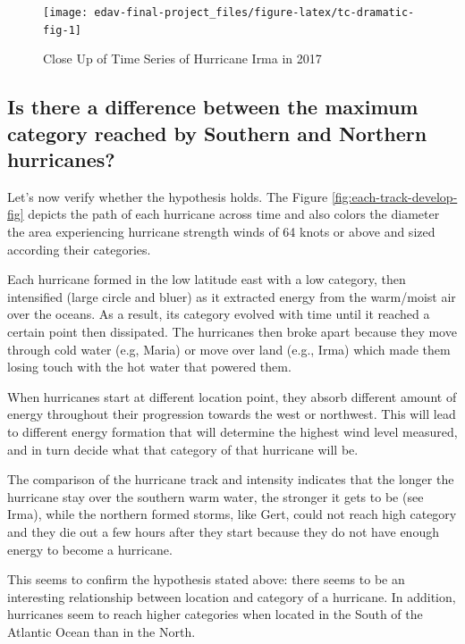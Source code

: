 \documentclass[]{book}
\begin{document}
\begin{figure}

{\centering \texttt{[image: edav-final-project\_files/figure-latex/tc-dramatic-fig-1]} 

}

\caption{Close Up of Time Series of Hurricane Irma in 2017}\label{fig:tc-dramatic-fig}
\end{figure}

\hypertarget{is-there-a-difference-between-the-maximum-category-reached-by-southern-and-northern-hurricanes}{%
\subsection{Is there a difference between the maximum category reached by Southern and Northern hurricanes?}\label{is-there-a-difference-between-the-maximum-category-reached-by-southern-and-northern-hurricanes}}

Let's now verify whether the hypothesis holds. The Figure \ref{fig:each-track-develop-fig} depicts the path of each hurricane across time and also colors the diameter the area experiencing hurricane strength winds of 64 knots or above and sized according their categories.

Each hurricane formed in the low latitude east with a low category, then intensified (large circle and bluer) as it extracted energy from the warm/moist air over the oceans. As a result, its category evolved with time until it reached a certain point then dissipated. The hurricanes then broke apart because they move through cold water (e.g, Maria) or move over land (e.g., Irma) which made them losing touch with the hot water that powered them.

When hurricanes start at different location point, they absorb different amount of energy throughout their progression towards the west or northwest. This will lead to different energy formation that will determine the highest wind level measured, and in turn decide what that category of that hurricane will be.

The comparison of the hurricane track and intensity indicates that the longer the hurricane stay over the southern warm water, the stronger it gets to be (see Irma), while the northern formed storms, like Gert, could not reach high category and they die out a few hours after they start because they do not have enough energy to become a hurricane.

This seems to confirm the hypothesis stated above: there seems to be an interesting relationship between location and category of a hurricane. In addition, hurricanes seem to reach higher categories when located in the South of the Atlantic Ocean than in the North.
\end{document}
